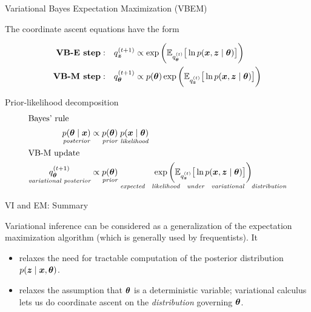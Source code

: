 \documentclass[10pt]{beamer}
\begin{document}
\begin{frame}{Variational Bayes Expectation Maximization (VBEM)}

The coordinate ascent equations have the form

\begin{align}
\textbf{VB-E step}: \quad & q_{{\boldsymbol z}}^{(t+1)} \propto \exp \bigg( \mathbb{E}_{q_{{\boldsymbol \theta}}^{(t)}} \big[\ln p({\boldsymbol x}, {\boldsymbol z} \; | \; {\boldsymbol \theta}) \big] \bigg)  \label{vbe_update} \\
\textbf{VB-M step}: \quad & q_{{\boldsymbol \theta}}^{(t+1)} \propto p({\boldsymbol \theta}) \exp \bigg( \mathbb{E}_{q_{{\boldsymbol z}}^{(t)}} \big[\ln p({\boldsymbol x}, {\boldsymbol z} \; | \; {\boldsymbol \theta}) \big] \bigg) \label{vbm_update}
\end{align} 


 
\begin{block}{Prior-likelihood decomposition}
\begin{align*}
\intertext{Bayes' rule}
\underset{\textit{posterior}}{p({\boldsymbol \theta} \; | \; {\boldsymbol x})} & \propto \underset{\textit{prior}}{p({\boldsymbol \theta})}  \;  \underset{\textit{likelihood}}{p({\boldsymbol x} \; | \; {\boldsymbol \theta})} \\
\intertext{VB-M update}
\underset{\textit{variational posterior}}{q_{{\boldsymbol \theta}}^{(t+1)}} & \propto \underset{\textit{prior}}{p({\boldsymbol \theta})} \;  \underset{\textit{expected \; likelihood \; under \; variational \; distribution}}{ \exp  \bigg( \mathbb{E}_{q_{{\boldsymbol z}}^{(t)}} \big[ \ln p({\boldsymbol x}, {\boldsymbol z} \; | \; {\boldsymbol \theta}) \big] \bigg)} \\
\end{align*}
\end{block}

\end{frame}






\begin{frame}{VI and EM: Summary}

Variational inference can be considered as a generalization of the expectation maximization algorithm (which is generally used by frequentists).  It

\begin{itemize}
\item relaxes the need for tractable computation of the posterior distribution $p({\boldsymbol z} \; | \; {\boldsymbol x}, {\boldsymbol \theta})$. 
\item relaxes the assumption that ${\boldsymbol \theta}$ is a deterministic variable; variational calculus lets us do coordinate ascent on the \textit{distribution} governing ${\boldsymbol \theta}$. 
\end{itemize}
\end{frame}
\end{document}
